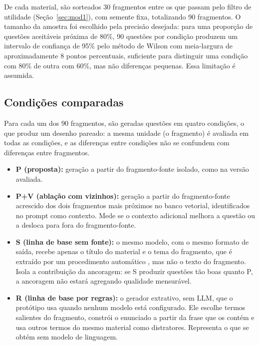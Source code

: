 De cada material, são sorteados 30 fragmentos entre os que passam pelo filtro de utilidade (Seção~\ref{sec:mod1}), com semente fixa, totalizando 90 fragmentos. O tamanho da amostra foi escolhido pela precisão desejada: para uma proporção de questões aceitáveis próxima de 80\%, 90 questões por condição produzem um intervalo de confiança de 95\% pelo método de Wilson \cite{Wil27} com meia-largura de aproximadamente 8 pontos percentuais, suficiente para distinguir uma condição com 80\% de outra com 60\%, mas não diferenças pequenas. Essa limitação é assumida.

\subsection{Condições comparadas}

Para cada um dos 90 fragmentos, são geradas questões em quatro condições, o que produz um desenho pareado: a mesma unidade (o fragmento) é avaliada em todas as condições, e as diferenças entre condições não se confundem com diferenças entre fragmentos.

\begin{itemize}
  \item \textbf{P (proposta):} geração a partir do fragmento-fonte isolado, como na versão avaliada.
  \item \textbf{P+V (ablação com vizinhos):} geração a partir do fragmento-fonte acrescido dos dois fragmentos mais próximos no banco vetorial, identificados no prompt como contexto. Mede se o contexto adicional melhora a questão ou a desloca para fora do fragmento-fonte.
  \item \textbf{S (linha de base sem fonte):} o mesmo modelo, com o mesmo formato de saída, recebe apenas o título do material e o tema do fragmento, que é extraído por um procedimento automático , mas não o texto do fragmento. Isola a contribuição da ancoragem: se S produzir questões tão boas quanto P, a ancoragem não estará agregando qualidade mensurável.
  \item \textbf{R (linha de base por regras):} o gerador extrativo, sem LLM, que o protótipo usa quando nenhum modelo está configurado. Ele escolhe termos salientes do fragmento, constrói o enunciado a partir da frase que os contém e usa outros termos do mesmo material como distratores. Representa o que se obtém sem modelo de linguagem.
\end{itemize}


